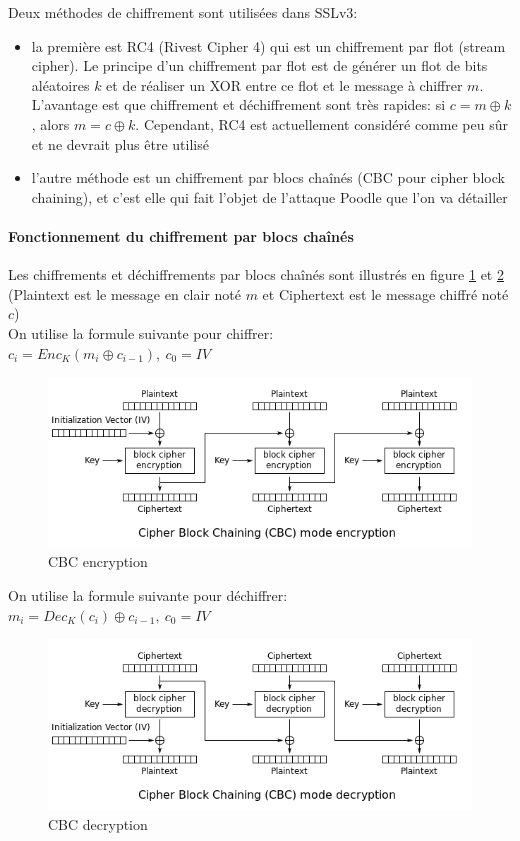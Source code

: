 Deux méthodes de chiffrement sont utilisées dans SSLv3:
\begin{itemize}
\item la première est RC4 (Rivest Cipher 4) qui est un chiffrement par flot (stream cipher). Le principe d'un chiffrement par flot est de générer un flot de bits aléatoires $k$ et de réaliser un XOR entre ce flot et le message à chiffrer $m$. L'avantage est que chiffrement et déchiffrement sont très rapides: si $c = m \oplus k$, alors $m = c \oplus k$. Cependant, RC4 est actuellement considéré comme peu s\^ur et ne devrait plus \^etre utilisé
\item l'autre méthode est un chiffrement par blocs cha\^inés (CBC pour cipher block chaining), et c'est elle qui fait l'objet de l'attaque Poodle que l'on va détailler
\end{itemize}

\paragraph{Fonctionnement du chiffrement par blocs cha\^inés}

Les chiffrements et déchiffrements par blocs cha\^inés sont illustrés en figure \ref{cbc-enc} et \ref{cbc-dec} (Plaintext est le message en clair noté $m$ et Ciphertext est le message chiffré noté $c$) \\

\noindent On utilise la formule suivante pour chiffrer: \\
$c_i = Enc_K(m_i \oplus c_{i-1}),\ c_0 = IV$

\begin{figure}[H]
\includegraphics[scale=0.6]{img/cbc-enc.png}
\caption{CBC encryption}
\label{cbc-enc}
\end{figure}

\noindent On utilise la formule suivante pour déchiffrer: \\
$m_i = Dec_K(c_i) \oplus c_{i-1},\ c_0 = IV$ 

\begin{figure}[H]
\includegraphics[scale=0.6]{img/cbc-dec.png}
\caption{CBC decryption}
\label{cbc-dec}
\end{figure}


